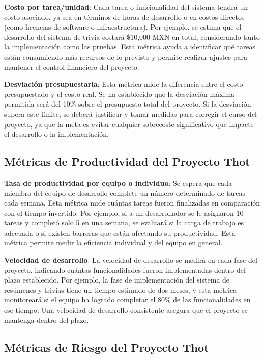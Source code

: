 \documentclass{report}
\begin{document}
    \justify
    \textbf{Costo por tarea/unidad}: Cada tarea o funcionalidad del sistema tendrá un costo asociado, ya sea en términos de horas de desarrollo o en costos directos (como licencias de software o infraestructura). Por ejemplo, se estima que el desarrollo del sistema de trivia costará \$10,000 MXN en total, considerando tanto la implementación como las pruebas. Esta métrica ayuda a identificar qué tareas están consumiendo más recursos de lo previsto y permite realizar ajustes para mantener el control financiero del proyecto.

    \justify
    \textbf{Desviación presupuestaria}: Esta métrica mide la diferencia entre el costo presupuestado y el costo real. Se ha establecido que la desviación máxima permitida será del 10\% sobre el presupuesto total del proyecto. Si la desviación supera este límite, se deberá justificar y tomar medidas para corregir el curso del proyecto, ya que la meta es evitar cualquier sobrecoste significativo que impacte el desarrollo o la implementación.

    \subsection{Métricas de Productividad del Proyecto Thot}

    \justify
    \textbf{Tasa de productividad por equipo o individuo}: Se espera que cada miembro del equipo de desarrollo complete un número determinado de tareas cada semana. Esta métrica mide cuántas tareas fueron finalizadas en comparación con el tiempo invertido. Por ejemplo, si a un desarrollador se le asignaron 10 tareas y completó solo 5 en una semana, se evaluará si la carga de trabajo es adecuada o si existen barreras que están afectando su productividad. Esta métrica permite medir la eficiencia individual y del equipo en general.

    \justify
    \textbf{Velocidad de desarrollo}: La velocidad de desarrollo se medirá en cada fase del proyecto, indicando cuántas funcionalidades fueron implementadas dentro del plazo establecido. Por ejemplo, la fase de implementación del sistema de resúmenes y trivias tiene un tiempo estimado de dos meses, y esta métrica monitoreará si el equipo ha logrado completar el 80\% de las funcionalidades en ese tiempo. Una velocidad de desarrollo consistente asegura que el proyecto se mantenga dentro del plazo.

    \subsection{Métricas de Riesgo del Proyecto Thot}
\end{document}
